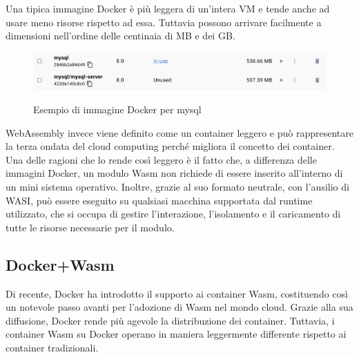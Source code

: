 Una tipica immagine Docker è più leggera di un'intera VM e tende anche ad usare meno risorse rispetto ad essa. Tuttavia
possono arrivare facilmente a dimensioni nell'ordine delle centinaia di MB e dei GB.

\begin{figure}[h]
    \centering
    \captionsetup{justification=centering}
    \includegraphics[width=15cm]{./chapters/2.wasi-in-depth/images/8.docker-images-size.png}
    \label{mysql_docker_image}
    \caption{Esempio di immagine Docker per mysql}
\end{figure}

WebAssembly invece viene definito come un container leggero e può rappresentare la terza ondata del cloud computing
perché migliora il concetto dei container. Una delle ragioni che lo rende così leggero è il fatto che, a differenza
delle immagini Docker, un modulo Wasm non richiede di essere inserito all'interno di un mini sistema operativo. Inoltre,
grazie al suo formato neutrale, con l'ausilio di WASI, può essere eseguito su qualsiasi macchina supportata dal runtime
utilizzato, che si occupa di gestire l'interazione, l'isolamento e il caricamento di tutte le risorse necessarie per il
modulo.

\subsection{Docker+Wasm}
Di recente, Docker ha introdotto il supporto ai container Wasm\cite{docker-wasm-tech-preview}, costituendo così un
notevole passo avanti per l'adozione di Wasm nel mondo cloud. Grazie alla sua diffusione, Docker rende più agevole la
distribuzione dei container. Tuttavia, i container Wasm su Docker operano in maniera leggermente differente rispetto ai
container tradizionali.

